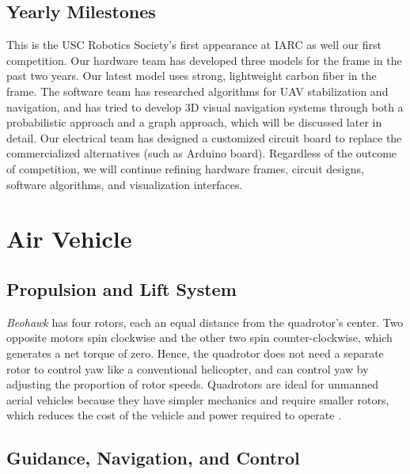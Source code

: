 \documentclass[12pt, letterpaper]{article}
\begin{document}
\subsection{Yearly Milestones}

This is the USC Robotics Society's first appearance at IARC as well our first competition. Our hardware team has developed three models for the frame in the past two years. Our latest model uses strong, lightweight carbon fiber in the frame. The software team has researched algorithms for UAV stabilization and navigation, and has tried to develop 3D visual navigation systems through both a probabilistic approach and a graph approach, which will be discussed later in detail. Our electrical team has designed a customized circuit board to replace the commercialized alternatives (such as Arduino board). Regardless of the outcome of competition, we will continue refining hardware frames, circuit designs, software algorithms, and visualization interfaces.


\section{Air Vehicle}

\subsection{Propulsion and Lift System}
\emph{Beohawk} has four rotors, each an equal distance from the quadrotor's center.  Two opposite motors spin clockwise and the other two spin counter-clockwise, which generates a net torque of zero.  Hence, the quadrotor does not need a separate rotor to control yaw like a conventional helicopter, and can control yaw by adjusting the proportion of rotor speeds.  Quadrotors are ideal for unmanned aerial vehicles because they have simpler mechanics and require smaller rotors, which reduces the cost of the vehicle and power required to operate \cite{bib:quadrotor}.

\subsection{Guidance, Navigation, and Control}
\end{document}
